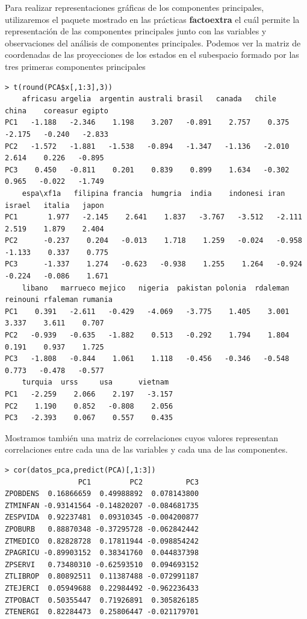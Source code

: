 \documentclass[12pt,twoside]{report}
\begin{document}
Para realizar representaciones gráficas de los componentes principales, utilizaremos el paquete mostrado en las prácticas \textbf{factoextra} el cuál permite la representación de las componentes principales junto con las variables y observaciones del análisis de componentes principales. Podemos ver la matriz
de coordenadas de las proyecciones de los estados en el subespacio formado por las tres primeras componentes principales
\scriptsize \begin{verbatim}
> t(round(PCA$x[,1:3],3))
    africasu argelia  argentin australi brasil   canada   chile    china    coreasur egipto  
PC1   -1.188   -2.346    1.198    3.207   -0.891    2.757    0.375   -2.175   -0.240   -2.833
PC2   -1.572   -1.881   -1.538   -0.894   -1.347   -1.136   -2.010    2.614    0.226   -0.895
PC3    0.450   -0.811    0.201    0.839    0.899    1.634   -0.302    0.965   -0.022   -1.749
    espa\xf1a   filipina francia  humgria  india    indonesi iran     israel   italia   japon   
PC1       1.977   -2.145    2.641    1.837   -3.767   -3.512   -2.111    2.519    1.879    2.404
PC2      -0.237    0.204   -0.013    1.718    1.259   -0.024   -0.958   -1.133    0.337    0.775
PC3      -1.337    1.274   -0.623   -0.938    1.255    1.264   -0.924   -0.224   -0.086    1.671
    libano   marrueco mejico   nigeria  pakistan polonia  rdaleman reinouni rfaleman rumania 
PC1    0.391   -2.611   -0.429   -4.069   -3.775    1.405    3.001    3.337    3.611    0.707
PC2   -0.939   -0.635   -1.882    0.513   -0.292    1.794    1.804    0.191    0.937    1.725
PC3   -1.808   -0.844    1.061    1.118   -0.456   -0.346   -0.548    0.773   -0.478   -0.577
    turquia  urss     usa      vietnam 
PC1   -2.259    2.066    2.197   -3.157
PC2    1.190    0.852   -0.808    2.056
PC3   -2.393    0.067    0.557    0.435
\end{verbatim}
\normalsize

Mostramos también una matriz de correlaciones cuyos valores representan correlaciones entre cada una de las variables y cada una de las componentes.

\begin{lstlisting}
> cor(datos_pca,predict(PCA)[,1:3])
                 PC1         PC2          PC3
ZPOBDENS  0.16866659  0.49988892  0.078143800
ZTMINFAN -0.93141564 -0.14820207 -0.084681735
ZESPVIDA  0.92237481  0.09310345 -0.004200877
ZPOBURB   0.88870348 -0.37295728 -0.062842442
ZTMEDICO  0.82828728  0.17811944 -0.098854242
ZPAGRICU -0.89903152  0.38341760  0.044837398
ZPSERVI   0.73480310 -0.62593510  0.094693152
ZTLIBROP  0.80892511  0.11387488 -0.072991187
ZTEJERCI  0.05949688  0.22984492 -0.962236433
ZTPOBACT  0.50355447  0.71926891  0.305826185
ZTENERGI  0.82284473  0.25806447 -0.021179701
\end{lstlisting}
\end{document}
